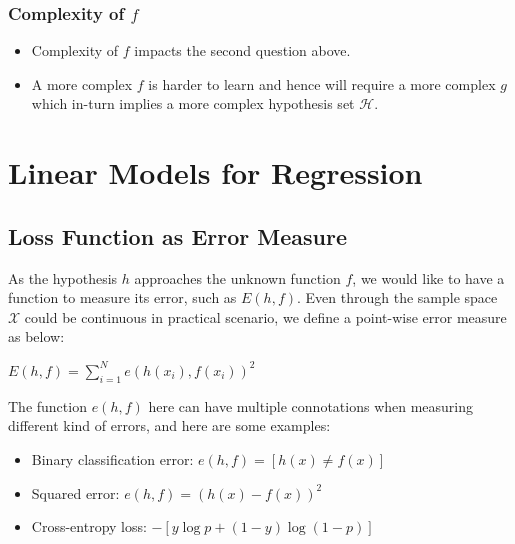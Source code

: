\documentclass{article}
\begin{document}
\subsubsection{Complexity of $f$}
\begin{itemize}
    \item Complexity of $f$ impacts the second question above.
    \item A more complex $f$ is harder to learn and hence will require a more complex $g$ which in-turn implies a more complex hypothesis set $\mathcal{H}$.
\end{itemize}
\newpage

\section{Linear Models for Regression}
\subsection{Loss Function as Error Measure}
As the hypothesis $h$ approaches the unknown function $f$, we would like to have a function to measure its error, such as $E(h,f)$. Even through the sample space $\mathcal{X}$ could be continuous in practical scenario, we define a point-wise error measure as below:
\begin{tcolorbox}[colback=yellow!20, colframe=yellow!90, title=Basic Error Measure Function, coltitle=black]
$E(h,f) = \sum_{i=1}^{N}e(h(x_{i}), f(x_{i}))^{2}$
\end{tcolorbox}
The function $e(h,f)$ here can have multiple connotations when measuring different kind of errors, and here are some examples:
\begin{itemize}
    \item Binary classification error: $e(h, f)=[h(x)\neq f(x)]$
    \item Squared error: $e(h,f)=(h(x)-f(x))^{2}$
    \item Cross-entropy loss: $-[y\log p + (1-y)\log (1-p)]$
\end{itemize}
\end{document}
